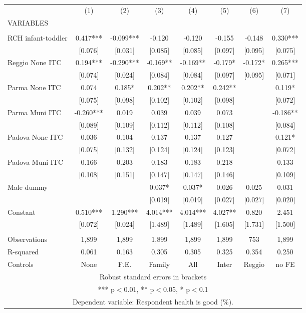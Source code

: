 \begin{tabular}{lccccccc} \hline
 & (1) & (2) & (3) & (4) & (5) & (6) & (7) \\
VARIABLES &  &  &  &  &  &  &  \\ \hline
 &  &  &  &  &  &  &  \\
RCH infant-toddler & 0.417*** & -0.099*** & -0.120 & -0.120 & -0.155 & -0.148 & 0.330*** \\
 & [0.076] & [0.031] & [0.085] & [0.085] & [0.097] & [0.095] & [0.075] \\
Reggio None ITC & 0.194*** & -0.290*** & -0.169** & -0.169** & -0.179* & -0.172* & 0.265*** \\
 & [0.074] & [0.024] & [0.084] & [0.084] & [0.097] & [0.095] & [0.071] \\
Parma None ITC & 0.074 & 0.185* & 0.202** & 0.202** & 0.242** &  & 0.119* \\
 & [0.075] & [0.098] & [0.102] & [0.102] & [0.098] &  & [0.072] \\
Parma Muni ITC & -0.260*** & 0.019 & 0.039 & 0.039 & 0.073 &  & -0.186** \\
 & [0.089] & [0.109] & [0.112] & [0.112] & [0.108] &  & [0.084] \\
Padova None ITC & 0.036 & 0.104 & 0.137 & 0.137 & 0.127 &  & 0.121* \\
 & [0.075] & [0.132] & [0.124] & [0.124] & [0.123] &  & [0.072] \\
Padova Muni ITC & 0.166 & 0.203 & 0.183 & 0.183 & 0.218 &  & 0.133 \\
 & [0.108] & [0.151] & [0.147] & [0.147] & [0.146] &  & [0.109] \\
Male dummy &  &  & 0.037* & 0.037* & 0.026 & 0.025 & 0.031 \\
 &  &  & [0.019] & [0.019] & [0.027] & [0.027] & [0.020] \\
Constant & 0.510*** & 1.290*** & 4.014*** & 4.014*** & 4.027** & 0.820 & 2.451 \\
 & [0.072] & [0.024] & [1.489] & [1.489] & [1.605] & [1.731] & [1.500] \\
 &  &  &  &  &  &  &  \\
Observations & 1,899 & 1,899 & 1,899 & 1,899 & 1,899 & 753 & 1,899 \\
R-squared & 0.061 & 0.163 & 0.305 & 0.305 & 0.325 & 0.354 & 0.250 \\
 Controls & None & F.E. & Family & All & Inter & Reggio & no FE \\ \hline
\multicolumn{8}{c}{ Robust standard errors in brackets} \\
\multicolumn{8}{c}{ *** p$<$0.01, ** p$<$0.05, * p$<$0.1} \\
\multicolumn{8}{c}{ Dependent variable: Respondent health is good (\%).} \\
\end{tabular}
